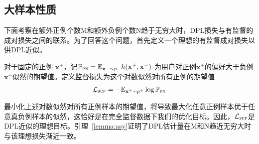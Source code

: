 \subsection{大样本性质}
下面考察在额外正例个数M和额外负例个数N趋于无穷大时，DPL损失与有监督的成对损失之间的联系。为了回答这个问题，首先定义一个理想的有监督成对损失以供DPL近似。
\begin{definition}
对于固定的正例 $\mathbf{x}^+$，记$\mathbb{P}_\textsc{pn} = \mathbb{E}_{\mathbf{x}^-\sim p^-}h(\mathbf{x}^+,\mathbf{x}^-)$ 为用户对正例$\mathbf{x}^+$的偏好大于负例$\mathbf{x}^-$似然的期望值。定义监督损失为这个对数似然对所有正例的期望值
	\begin{eqnarray}
		\mathcal{L}_\textsc{sup} =  -\mathbb{E}_{\mathbf{x}^+\sim p^+} \log \mathbb{P}_\textsc{pn}
	\end{eqnarray}
\end{definition}
最小化上述对数似然对所有正例样本的期望值，将导致最大化任意正例样本优于任意真负例样本的似然，这恰好是在完全监督数据下我们的优化目标。因此，$\mathcal{L}_\textsc{sup}$是DPL近似的理想目标。引理~\ref{lemma:asy}证明了DPL估计量在M和N趋近无穷大时与该理想损失渐近一致。
